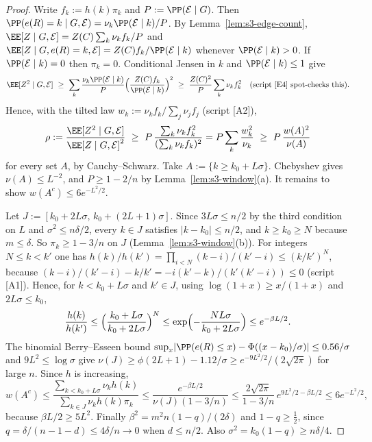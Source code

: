 \begin{proof}
Write \(f_k:=h(k)\pi_k\) and \(P:=\PP(\mathcal E\mid G)\). Then
\(\PP(e(R)=k\mid G,\mathcal E)=\nu_k\PP(\mathcal E\mid k)/P\). By
Lemma~\ref{lem:s3-edge-count}, \(\EE[Z\mid G,\mathcal E]=Z(C)\sum_k\nu_kf_k/P\) and
\(\EE[Z\mid G,e(R)=k,\mathcal E]=Z(C)f_k/\PP(\mathcal E\mid k)\) whenever
\(\PP(\mathcal E\mid k)>0\). If \(\PP(\mathcal E\mid k)=0\) then \(\pi_k=0\).
Conditional Jensen in \(k\) and \(\PP(\mathcal E\mid k)\le1\) give
\[
\EE[Z^2\mid G,\mathcal E]\ \ge\ \sum_k\frac{\nu_k\PP(\mathcal E\mid k)}{P}
\Bigl(\frac{Z(C)f_k}{\PP(\mathcal E\mid k)}\Bigr)^2
\ \ge\ \frac{Z(C)^2}{P}\sum_k\nu_kf_k^2
\quad\text{(script [E4] spot-checks this)}.
\]
Hence, with the tilted law \(w_k:=\nu_kf_k/\sum_j\nu_jf_j\) (script [A2]),
\[
\rho:=\frac{\EE[Z^2\mid G,\mathcal E]}{\EE[Z\mid G,\mathcal E]^2}
\ \ge\ P\,\frac{\sum_k\nu_kf_k^2}{(\sum_k\nu_kf_k)^2}
=P\sum_k\frac{w_k^2}{\nu_k}
\ \ge\ P\,\frac{w(A)^2}{\nu(A)}
\]
for every set \(A\), by Cauchy--Schwarz. Take \(A:=\{k\ge k_0+L\sigma\}\). Chebyshev gives
\(\nu(A)\le L^{-2}\), and \(P\ge1-2/n\) by Lemma~\ref{lem:s3-window}(a).
It remains to show \(w(A^c)\le6e^{-L^2/2}\).

Let \(J:=[k_0+2L\sigma,\,k_0+(2L+1)\sigma]\). Since \(3L\sigma\le n/2\) by the third
condition on \(L\) and \(\sigma^2\le n\delta/2\), every \(k\in J\) satisfies
\(\lvert k-k_0\rvert\le n/2\), and \(k\ge k_0\ge N\) because \(m\le\delta\). So \(\pi_k\ge1-3/n\) on \(J\)
(Lemma~\ref{lem:s3-window}(b)). For integers \(N\le k<k'\) one has
\(h(k)/h(k')=\prod_{i<N}(k-i)/(k'-i)\le(k/k')^N\), because
\((k-i)/(k'-i)-k/k'=-i(k'-k)/(k'(k'-i))\le0\) (script [A1]). Hence, for \(k<k_0+L\sigma\) and
\(k'\in J\), using \(\log(1+x)\ge x/(1+x)\) and \(2L\sigma\le k_0\),
\[
\frac{h(k)}{h(k')}\le\Bigl(\frac{k_0+L\sigma}{k_0+2L\sigma}\Bigr)^{N}
\le\exp\Bigl(-\frac{NL\sigma}{k_0+2L\sigma}\Bigr)\le e^{-\beta L/2}.
\]
The binomial Berry--Esseen bound
\(\sup_x\lvert\PP(e(R)\le x)-\Phi((x-k_0)/\sigma)\rvert\le0.56/\sigma\) and
\(9L^2\le\log\sigma\) give
\(\nu(J)\ge\phi(2L+1)-1.12/\sigma\ge e^{-9L^2/2}/(2\sqrt{2\pi})\) for large \(n\). Since \(h\) is increasing,
\[
w(A^c)\le\frac{\sum_{k<k_0+L\sigma}\nu_kh(k)}{\sum_{k\in J}\nu_kh(k)\pi_k}
\le\frac{e^{-\beta L/2}}{\nu(J)(1-3/n)}
\le\frac{2\sqrt{2\pi}}{1-3/n}\,e^{9L^2/2-\beta L/2}\le6e^{-L^2/2},
\]
because \(\beta L/2\ge5L^2\). Finally \(\beta^2=m^2n(1-q)/(2\delta)\) and
\(1-q\ge\tfrac12\), since \(q=\delta/(n-1-d)\le4\delta/n\to0\) when \(d\le n/2\). Also
\(\sigma^2=k_0(1-q)\ge n\delta/4\).
\end{proof}

